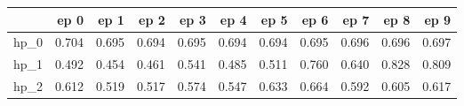 \begin{tabular}{lrrrrrrrrrr}
\toprule
{} &   ep 0 &   ep 1 &   ep 2 &   ep 3 &   ep 4 &   ep 5 &   ep 6 &   ep 7 &   ep 8 &   ep 9 \\
\midrule
hp\_0 &  0.704 &  0.695 &  0.694 &  0.695 &  0.694 &  0.694 &  0.695 &  0.696 &  0.696 &  0.697 \\
hp\_1 &  0.492 &  0.454 &  0.461 &  0.541 &  0.485 &  0.511 &  0.760 &  0.640 &  0.828 &  0.809 \\
hp\_2 &  0.612 &  0.519 &  0.517 &  0.574 &  0.547 &  0.633 &  0.664 &  0.592 &  0.605 &  0.617 \\
\bottomrule
\end{tabular}

